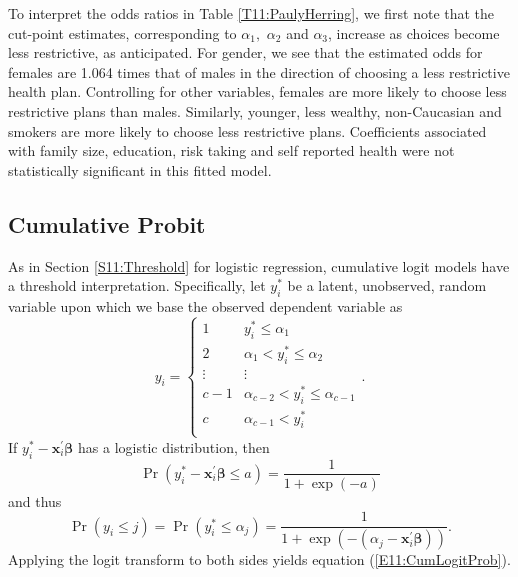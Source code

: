 To interpret the odds ratios in Table \ref{T11:PaulyHerring}, we
first note that the cut-point estimates, corresponding to $\alpha_1,$ $\alpha_2$ and $\alpha_3$,
increase as choices become less restrictive, as anticipated. For gender, we see that the
estimated odds for females are 1.064 times that of males in the
direction of choosing a less restrictive health plan. Controlling
for other variables, females are more likely to choose less
restrictive plans than males. Similarly, younger, less wealthy,
non-Caucasian and smokers are more likely to choose less restrictive
plans. Coefficients associated with family size, education, risk
taking and self reported health were not statistically significant
in this fitted model.

\linejed

\subsection{Cumulative Probit}

As in Section \ref{S11:Threshold} for logistic regression,
cumulative logit models have a threshold interpretation.
Specifically, let $y_i^{\ast}$ be a latent, unobserved, random
variable upon which we base the observed dependent variable as
\begin{equation*}
y_i=\left\{
\begin{array}{cc}
1 & y_i^{\ast} \leq \alpha_1 \\
2 & \alpha_1 < y_i^{\ast} \leq \alpha_2 \\
\vdots & \vdots \\
c-1 & \alpha_{c-2} < y_i^{\ast} \leq \alpha_{c-1} \\
c & \alpha_{c-1} < y_i^{\ast}\\
\end{array}%
\right. .
\end{equation*}
If $y_i^{\ast} - \mathbf{x}_i^{\prime}\boldsymbol \beta$  has a
logistic distribution, then
\begin{equation*}
\Pr(y_i^{\ast} - \mathbf{x}_i^{\prime}\boldsymbol \beta \leq
a)=\frac{1}{1+\exp (-a)}
\end{equation*}
and thus
\begin{equation*}
\Pr(y_i \leq j ) = \Pr(y_i^{\ast} \leq \alpha_j) =\frac{1}{1+\exp
\left( -(\alpha_j - \mathbf{x}_i^{\prime}\boldsymbol \beta)
\right)}.
\end{equation*}
Applying the logit transform to both sides yields equation
(\ref{E11:CumLogitProb}).

